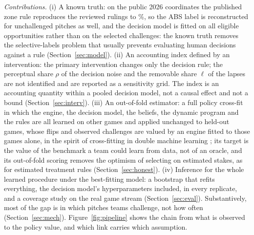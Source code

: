 \documentclass[aoas]{imsart}
\theoremstyle{plain}
\theoremstyle{definition}
\begin{document}
\emph{Contributions.} (i) A known truth: on the public 2026 coordinates the published zone rule reproduces the
reviewed rulings to \GeomRepro\%, so the ABS label is reconstructed for unchallenged pitches as well, and the decision
model is fitted on all eligible opportunities rather than on the selected challenges: the known truth removes the
selective-labels problem that usually prevents evaluating human decisions against a rule
\citep{LakkarajuEtAl2017,KleinbergEtAl2018} (Section~\ref{sec:model}). (ii) An accounting index
defined by an intervention: the primary intervention changes only the decision rule; the perceptual share $\rho$ of the
decision noise and the removable share $\ell$ of the lapses are not identified and are reported as a sensitivity grid.
The index is an accounting quantity within a pooled decision model, not a causal effect and not a bound
(Section~\ref{sec:interv}). (iii) An out-of-fold estimator: a full policy cross-fit in which the engine, the decision model,
the beliefs, the dynamic program and the rules are all learned on other games and applied unchanged to held-out games,
whose flips and observed challenges are valued by an engine fitted to those games alone, in the spirit of
cross-fitting in double machine learning \citep{ChernozhukovEtAl2018}; its target is the value of the benchmark a team
could learn from data, not of an oracle, and its out-of-fold scoring removes the optimism of selecting on estimated stakes, as for
estimated treatment rules \citep{HiranoPorter2009,AndrewsEtAl2024} (Section~\ref{sec:honest}). (iv) Inference for the whole learned procedure under
the best-fitting model: a bootstrap that refits everything, the decision model's hyperparameters included, in every
replicate, and a coverage study on the real game stream (Section~\ref{sec:eval}). Substantively, most of the gap is in
which pitches teams challenge, not how often (Section~\ref{sec:mech}). Figure~\ref{fig:pipeline} shows the chain from
what is observed to the policy value, and which link carries which assumption.
\end{document}
